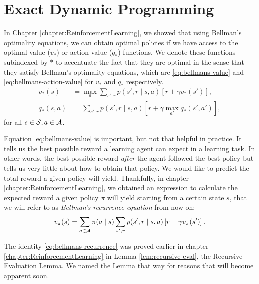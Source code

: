 \section{Exact Dynamic Programming}
In Chapter \ref{chapter:ReinforcementLearning}, we showed that using Bellman's
optimality equations, we can obtain optimal policies if we have access to the
optimal value ($v_*$) or action-value ($q_{*}$) functions. We denote these
functions subindexed by $*$ to accentuate the fact that they are optimal in the
sense that they satisfy Bellman's optimality equations, which are
\eqref{eq:bellmans-value} and \eqref{eq:bellmans-action-value} for $v_*$ and
$q_*$ respectively. 
\begin{align}
v_{*}(s) &= \max_{a} \sum_{s', r} p(s', r \mid s, a) \left[ r + \gamma v_{*} (s')
\right], \label{eq:bellmans-value} \\
q_{*}(s, a) &= \sum_{s', r} p(s', r \mid s, a) \left[ r + \gamma \max_{a'} q_{*}
(s', a') \right], \label{eq:bellmans-action-value}
\end{align}
for all $s \in \mathcal{S}, a \in \mathcal{A}$.

Equation \eqref{eq:bellmans-value} is important, but not that helpful in
practice. It tells us the best possible reward a learning agent can expect in a
learning task. In other words, the best possible reward \textit{after} the agent
followed the best policy but tells us very little about how to obtain that
policy. We would like to predict the total reward a given policy will yield.
Thankfully, in chapter \ref{chapter:ReinforcementLearning}, we obtained an
expression to calculate the expected reward a given policy $\pi$ will yield
starting from a certain state $s$, that we will refer to as \textit{Bellman's
recurrence equation} from now on: 
\begin{equation}
\label{eq:bellmans-recurrence}
v_\pi (s) = \sum_{a \in \mathcal{A}} \pi(a \mid s) \sum_{s', r} p(s', r \mid s, a) \left[ r + \gamma v_{\pi}(s') \right].
\end{equation}

The identity \ref{eq:bellmans-recurrence} was proved earlier in chapter
\ref{chapter:ReinforcementLearning} in Lemma \ref{lem:recursive-eval}, the
Recursive Evaluation Lemma. We named the Lemma that way for reasons that will
become apparent soon.

